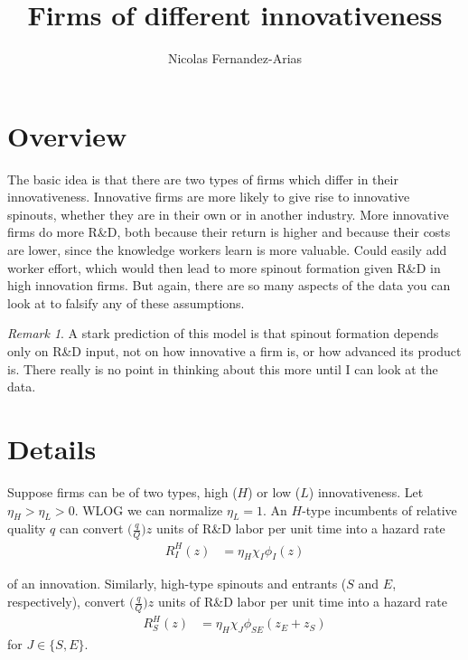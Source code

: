 \documentclass[12pt,english]{article}
\theoremstyle{remark}
\newtheorem*{remark}{Remark}
\begin{document}
	
\title{Firms of different innovativeness}
\author{Nicolas Fernandez-Arias}
\maketitle

\section{Overview}

The basic idea is that there are two types of firms which differ in their innovativeness. Innovative firms are more likely to give rise to innovative spinouts, whether they are in their own or in another industry. More innovative firms do more R\&D, both because their return is higher and because their costs are lower, since the knowledge workers learn is more valuable. Could easily add worker effort, which would then lead to more spinout formation given R\&D in high innovation firms. But again, there are so many aspects of the data you can look at to falsify any of these assumptions.



\begin{remark}
	A stark prediction of this model is that spinout formation depends only on R\&D input, not on how innovative a firm is, or how advanced its product is. There really is no point in thinking about this more until I can look at the data. 
\end{remark}

\section{Details}

Suppose firms can be of two types, high ($H$) or low ($L$) innovativeness. Let $\eta_H > \eta_L > 0$. WLOG we can normalize $\eta_L = 1$. An $H$-type incumbents of relative quality $q$ can convert $\Big(\frac{q}{Q}\Big) z$ units of R\&D labor per unit time into a hazard rate 
\begin{align}
	R_I^H(z) &= \eta_H \chi_I \phi_I(z)
\end{align}

of an innovation. Similarly, high-type spinouts and entrants ($S$ and $E$, respectively), convert $\Big(\frac{q}{Q}\Big) z$ units of R\&D labor per unit time into a hazard rate
\begin{align*}
	R_S^H(z) &= \eta_H \chi_J \phi_{SE}(z_E + z_S)
\end{align*}
for $J \in \{S,E\}$.
\end{document}
